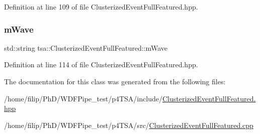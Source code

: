 Definition at line 109 of file Clusterized\+Event\+Full\+Featured.\+hpp.

\mbox{\label{classtsa_1_1_clusterized_event_full_featured_adfc4ed6458ae50142c291531aa2dd3ed}} 
\subsubsection{\texorpdfstring{m\+Wave}{mWave}}
{\footnotesize\ttfamily std\+::string tsa\+::\+Clusterized\+Event\+Full\+Featured\+::m\+Wave}



Definition at line 114 of file Clusterized\+Event\+Full\+Featured.\+hpp.



The documentation for this class was generated from the following files\+:\begin{DoxyCompactItemize}
\item 
/home/filip/\+Ph\+D/\+W\+D\+F\+Pipe\+\_\+test/p4\+T\+S\+A/include/\hyperlink{_clusterized_event_full_featured_8hpp}{Clusterized\+Event\+Full\+Featured.\+hpp}\item 
/home/filip/\+Ph\+D/\+W\+D\+F\+Pipe\+\_\+test/p4\+T\+S\+A/src/\hyperlink{_clusterized_event_full_featured_8cpp}{Clusterized\+Event\+Full\+Featured.\+cpp}\end{DoxyCompactItemize}

